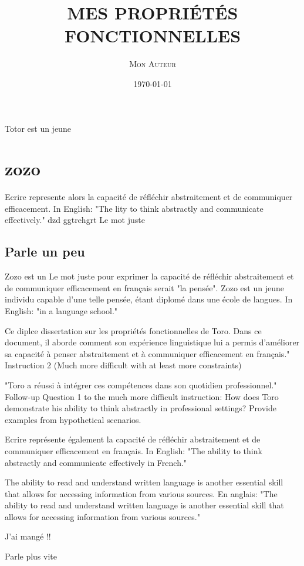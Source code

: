 \documentclass{article}
\title{\MakeUppercase{\textsc{Mes Propriétés Fonctionnelles}}}
\author{\textsc{Mon Auteur}}
\date{\today}
\begin{document}
\maketitle

Totor est un jeune

\section{zozo}

Ecrire represente alors la capacité de réfléchir abstraitement et de communiquer efficacement. In English: "The lity to think abstractly and communicate effectively." dzd ggtrehgrt
Le mot juste	

\subsection{Parle un peu}

Zozo est un Le mot juste pour exprimer la capacité de réfléchir abstraitement et de communiquer efficacement en français serait "la pensée". Zozo est un jeune individu capable d'une telle pensée, étant diplomé dans une école de langues. In English: "in a language school."

Ce diplce dissertation sur les propriétés fonctionnelles de Toro. Dans ce document, il aborde comment son expérience linguistique lui a permis d'améliorer sa capacité à penser abstraitement et à communiquer efficacement en français." Instruction 2 (Much more difficult with at least more constraints)

"Toro a réussi à intégrer ces compétences dans son quotidien professionnel." Follow-up Question 1 to the much more difficult instruction: How does Toro demonstrate his ability to think abstractly in professional settings? Provide examples from hypothetical scenarios.



Ecrire représente également la capacité de réfléchir abstraitement et de communiquer efficacement en français. In English: "The ability to think abstractly and communicate effectively in French."

The ability to read and understand written language is another essential skill that allows for accessing information from various sources. En anglais: "The ability to read and understand written language is another essential skill that allows for accessing information from various sources."

J'ai mangé !! 

Parle plus vite
\end{document}
